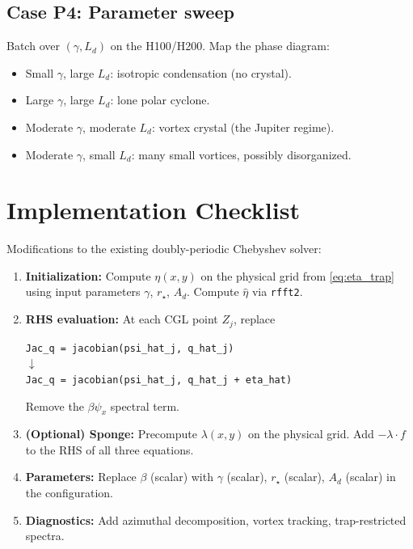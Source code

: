 \documentclass[11pt]{article}
\newcommand{\Ld}{L_d}
\newcommand{\hhat}[1]{\widehat{#1}}
\begin{document}
\subsection{Case P4: Parameter sweep}

Batch over $(\gamma, \Ld)$ on the H100/H200. Map the phase diagram:
\begin{itemize}[nosep]
\item Small $\gamma$, large $\Ld$: isotropic condensation (no crystal).
\item Large $\gamma$, large $\Ld$: lone polar cyclone.
\item Moderate $\gamma$, moderate $\Ld$: vortex crystal (the Jupiter regime).
\item Moderate $\gamma$, small $\Ld$: many small vortices, possibly disorganized.
\end{itemize}


\section{Implementation Checklist}
\label{sec:checklist}

Modifications to the existing doubly-periodic Chebyshev solver:

\begin{enumerate}[nosep]
\item \textbf{Initialization:} Compute $\eta(x,y)$ on the physical grid from \eqref{eq:eta_trap} using input parameters $\gamma$, $r_\star$, $A_d$. Compute $\hhat\eta$ via \texttt{rfft2}.

\item \textbf{RHS evaluation:} At each CGL point $Z_j$, replace
\begin{center}
\texttt{Jac\_q = jacobian(psi\_hat\_j, q\_hat\_j)} \\
$\downarrow$ \\
\texttt{Jac\_q = jacobian(psi\_hat\_j, q\_hat\_j + eta\_hat)}
\end{center}
Remove the $\beta\psi_x$ spectral term.

\item \textbf{(Optional) Sponge:} Precompute $\lambda(x,y)$ on the physical grid. Add $-\lambda\cdot f$ to the RHS of all three equations.

\item \textbf{Parameters:} Replace $\beta$ (scalar) with $\gamma$ (scalar), $r_\star$ (scalar), $A_d$ (scalar) in the configuration.

\item \textbf{Diagnostics:} Add azimuthal decomposition, vortex tracking, trap-restricted spectra.
\end{enumerate}
\end{document}
